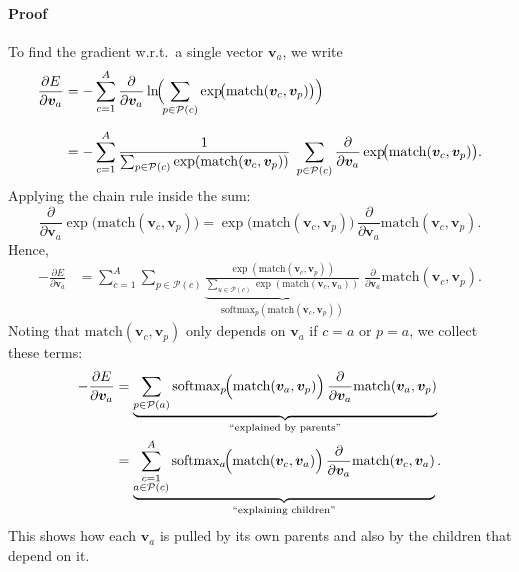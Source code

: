 \documentclass{article}
\begin{document}
\paragraph{Proof}
To find the gradient w.r.t.\ a single vector \(\bm{v}_a\), we write
\begin{equation}
\begin{aligned}
\frac{\partial E}{\partial \bm{v}_a}
&=
-\sum_{c=1}^A
\frac{\partial}{\partial \bm{v}_a}
\ln\!\Bigl(\!\sum_{p \in \mathcal{P}(c)} \exp\!\bigl(\mathrm{match}(\bm{v}_c,\bm{v}_p)\bigr)\Bigr) \\[6pt]
&=
-\sum_{c=1}^A
\frac{1}{\sum_{p \in \mathcal{P}(c)} \exp(\mathrm{match}(\bm{v}_c,\bm{v}_p))}
\;\sum_{p \in \mathcal{P}(c)}
\frac{\partial}{\partial \bm{v}_a}
\exp\!\bigl(\mathrm{match}(\bm{v}_c,\bm{v}_p)\bigr).
\end{aligned}
\end{equation}
Applying the chain rule inside the sum:
\begin{equation}
\frac{\partial}{\partial \bm{v}_a}
\exp\!\bigl(\mathrm{match}(\bm{v}_c,\bm{v}_p)\bigr)
=
\exp\!\bigl(\mathrm{match}(\bm{v}_c,\bm{v}_p)\bigr)\,
\frac{\partial}{\partial \bm{v}_a}
\mathrm{match}(\bm{v}_c,\bm{v}_p).
\end{equation}
Hence,
\begin{equation}
\begin{aligned}
-\frac{\partial E}{\partial \bm{v}_a}
&=
\sum_{c=1}^A
\sum_{p \in \mathcal{P}(c)}
\underbrace{
\frac{\exp(\mathrm{match}(\bm{v}_c,\bm{v}_p))}
     {\sum_{u \in \mathcal{P}(c)} \exp(\mathrm{match}(\bm{v}_c,\bm{v}_u))}
}_{\text{softmax}_{p}(\mathrm{match}(\bm{v}_c,\bm{v}_p))}
\;\frac{\partial}{\partial \bm{v}_a}
\mathrm{match}(\bm{v}_c,\bm{v}_p).
\end{aligned}
\end{equation}
Noting that
\(\mathrm{match}(\bm{v}_c,\bm{v}_p)\)
only depends on \(\bm{v}_a\) if \(c=a\) or \(p=a\), we collect these terms:
\begin{equation}
\begin{aligned}
-\frac{\partial E}{\partial \bm{v}_a}
&=
\underbrace{
\sum_{p \in \mathcal{P}(a)}
\text{softmax}_{p}\!\Bigl(\mathrm{match}(\bm{v}_a,\bm{v}_p)\Bigr)\,
\frac{\partial}{\partial \bm{v}_a}
\mathrm{match}(\bm{v}_a,\bm{v}_p)
}_{\text{``explained by parents''}}
\\
&= \underbrace{
\sum_{\substack{c=1\\a \in \mathcal{P}(c)}}^A
\text{softmax}_{a}\!\Bigl(\mathrm{match}(\bm{v}_c,\bm{v}_a)\Bigr)\,
\frac{\partial}{\partial \bm{v}_a}
\mathrm{match}(\bm{v}_c,\bm{v}_a)
}_{\text{``explaining children''}}.
\end{aligned}
\end{equation}
This shows how each \(\bm{v}_a\) is pulled by its own parents and also by the children that depend on it.
\end{document}

